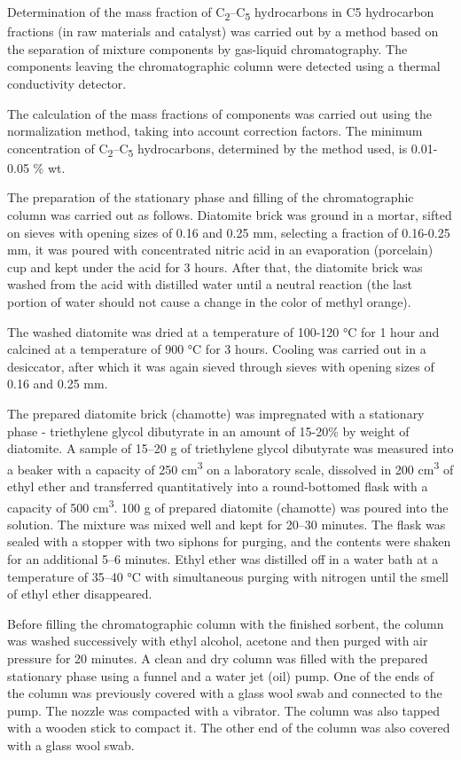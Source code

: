 Determination of the mass fraction of
C\textsubscript{2}--C\textsubscript{5} hydrocarbons in C5 hydrocarbon
fractions (in raw materials and catalyst) was carried out by a method
based on the separation of mixture components by gas-liquid
chromatography. The components leaving the chromatographic column were
detected using a thermal conductivity detector.

The calculation of the mass fractions of components was carried out
using the normalization method, taking into account correction factors.
The minimum concentration of C\textsubscript{2}--C\textsubscript{5}
hydrocarbons, determined by the method used, is 0.01-0.05 \% wt.

The preparation of the stationary phase and filling of the
chromatographic column was carried out as follows. Diatomite brick was
ground in a mortar, sifted on sieves with opening sizes of 0.16 and 0.25
mm, selecting a fraction of 0.16-0.25 mm, it was poured with
concentrated nitric acid in an evaporation (porcelain) cup and kept
under the acid for 3 hours. After that, the diatomite brick was washed
from the acid with distilled water until a neutral reaction (the last
portion of water should not cause a change in the color of methyl
orange).

The washed diatomite was dried at a temperature of 100-120 °C for 1 hour
and calcined at a temperature of 900 °C for 3 hours. Cooling was carried
out in a desiccator, after which it was again sieved through sieves with
opening sizes of 0.16 and 0.25 mm.

The prepared diatomite brick (chamotte) was impregnated with a
stationary phase - triethylene glycol dibutyrate in an amount of 15-20\%
by weight of diatomite. A sample of 15--20 g of triethylene glycol
dibutyrate was measured into a beaker with a capacity of 250
cm\textsuperscript{3} on a laboratory scale, dissolved in 200
cm\textsuperscript{3} of ethyl ether and transferred quantitatively into
a round-bottomed flask with a capacity of 500 cm\textsuperscript{3}. 100
g of prepared diatomite (chamotte) was poured into the solution. The
mixture was mixed well and kept for 20--30 minutes. The flask was sealed
with a stopper with two siphons for purging, and the contents were
shaken for an additional 5--6 minutes. Ethyl ether was distilled off in
a water bath at a temperature of 35--40 °C with simultaneous purging
with nitrogen until the smell of ethyl ether disappeared.

Before filling the chromatographic column with the finished sorbent, the
column was washed successively with ethyl alcohol, acetone and then
purged with air pressure for 20 minutes. A clean and dry column was
filled with the prepared stationary phase using a funnel and a water jet
(oil) pump. One of the ends of the column was previously covered with a
glass wool swab and connected to the pump. The nozzle was compacted with
a vibrator. The column was also tapped with a wooden stick to compact
it. The other end of the column was also covered with a glass wool swab.


